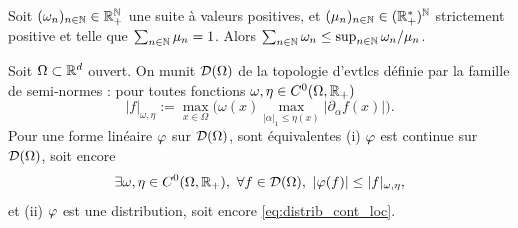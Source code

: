 \begin{lemma}
\label{lem:omegaNmuN}
%
	Soit $(\omega_n)_{n \in \mathbb{N}} \in \mathbb{R}_+^{\mathbb{N}}$ une suite à valeurs positives, et $(\mu_n)_{n \in \mathbb{N}}\in (\mathbb{R}_+^*)^{\mathbb{N}}$ strictement positive et telle que $\sum_{n\in \mathbb{N}} \mu_n=1$.
	Alors $\sum_{n \in \mathbb{N}} \omega_n \leq \sup_{n \in \mathbb{N}} \omega_n/\mu_n$. %
\end{lemma}

\begin{proposition}
\label{prop:distribCont}
Soit $\Omega\subset \mathbb{R}^d$ ouvert. On munit $\mathcal{D}(\Omega)$ de la topologie d'evtlcs définie par la famille de semi-normes : pour toutes fonctions $\omega,\eta \in C^0(\Omega, \mathbb{R}_+)$
\begin{equation*}
	|f|_{\omega,\eta} := \max_{x \in \Omega} \Big(\omega(x) \max_{|\alpha|_1 \leq \eta(x)} |\partial_\alpha f(x)|\Big).
\end{equation*}
Pour une forme linéaire $\varphi$ sur $\mathcal{D}(\Omega)$, sont équivalentes (i) $\varphi$ est continue sur $\mathcal{D}(\Omega)$, soit encore 
	\begin{equation}
	\label{eq:distrib_cont}
		\exists \omega, \eta \in C^0(\Omega,\mathbb{R}_+),\ \forall f \in \mathcal{D}(\Omega),\ |\varphi(f)| \leq |f|_{\omega,\eta},
	\end{equation}
et (ii) $\varphi$ est une distribution, soit encore \eqref{eq:distrib_cont_loc}. 
\end{proposition}

